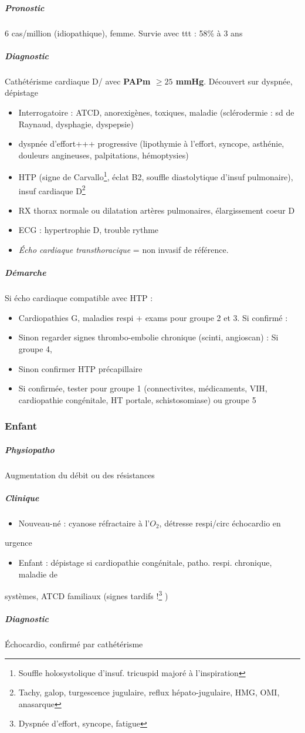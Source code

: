 \documentclass[11pt]{article}
\begin{document}
\subparagraph{Pronostic}
\label{sec:orgddfab51}
6 cas/million (idiopathique), femme. Survie avec ttt : 58\% à 3 ans

\subparagraph{Diagnostic}
\label{sec:orgaed950c}
Cathétérisme cardiaque D/ avec \textbf{PAPm \(\ge 25\) mmHg}. Découvert sur dyspnée, dépistage
\begin{itemize}
\item Interrogatoire : ATCD, anorexigènes, toxiques, maladie (sclérodermie : sd de
Raynaud, dysphagie, dyspepsie)
\item dyspnée d'effort+++ progressive (lipothymie à l'effort,
syncope, asthénie, douleurs angineuses, palpitations, hémoptysies)
\item HTP (signe de Carvallo\footnote{Souffle holosystolique d'insuf. tricuspid majoré à l'inspiration}, éclat B2, souffle diastolytique d'insuf pulmonaire), insuf cardiaque D\footnote{Tachy, galop, turgescence jugulaire, reflux hépato-jugulaire, HMG, OMI, anasarque}
\item RX thorax normale ou dilatation artères pulmonaires, élargissement coeur D
\item ECG : hypertrophie D, trouble rythme
\item \emph{Écho cardiaque transthoracique} = non invasif de référence.
\end{itemize}

\subparagraph{Démarche}
\label{sec:orgaec6735}
Si écho cardiaque compatible avec HTP :

\begin{itemize}
\item Cardiopathies G, maladies respi + exams pour groupe 2 et 3. Si confirmé : \faStop
\item Sinon regarder signes thrombo-embolie chronique (scinti, angioscan) : Si
groupe 4, \faStop
\item Sinon confirmer HTP précapillaire
\item Si confirmée, tester pour groupe 1 (connectivites, médicaments, VIH,
cardiopathie congénitale, HT portale, schistosomiase) ou groupe 5
\end{itemize}

\subsubsection{Enfant}
\label{sec:orgf884a7e}

\subparagraph{Physiopatho}
\label{sec:org5daf854}
Augmentation du débit ou des résistances

\subparagraph{Clinique}
\label{sec:org0511d89}
\begin{itemize}
\item Nouveau-né : cyanose réfractaire à l'\(O_2\), détresse respi/circ \thus échocardio en
\end{itemize}
urgence \danger
\begin{itemize}
\item Enfant : dépistage si cardiopathie congénitale, patho. respi. chronique, maladie de
\end{itemize}
systèmes, ATCD familiaux (signes tardifs !\footnote{Dyspnée d'effort, syncope, fatigue} )
\subparagraph{Diagnostic}
\label{sec:org7f11921}
Échocardio, confirmé par cathétérisme 
\end{document}

